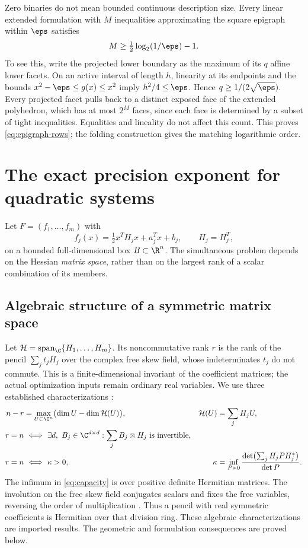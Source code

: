 Zero binaries do not mean bounded continuous description size. Every
linear extended formulation with $M$ inequalities approximating the
square epigraph within $\eps$ satisfies
\begin{equation}\label{eq:epigraph-rows}
 M\ge\tfrac12\log_2(1/\eps)-1.
\end{equation}
To see this, write the projected lower boundary as the maximum of its
$q$ affine lower facets. On an active interval of length $h$, linearity
at its endpoints and the bounds $x^2-\eps\le g(x)\le x^2$ imply
$h^2/4\le\eps$. Hence $q\ge1/(2\sqrt\eps)$. Every projected facet
pulls back to a distinct exposed face of the extended polyhedron, which
has at most $2^M$ faces, since each face is determined by a subset of
tight inequalities. Equalities and lineality do not affect this count.
This proves \eqref{eq:epigraph-rows}; the folding construction gives
the matching logarithmic order.

\section{The exact precision exponent for quadratic systems}\label{sec:ncrank}

Let $F=(f_1,\ldots,f_m)$ with
\[
 f_j(x)=\tfrac12x^TH_jx+a_j^Tx+b_j,\qquad H_j=H_j^T,
\]
on a bounded full-dimensional box $B\subset\R^n$. The simultaneous
problem depends on the Hessian \emph{matrix space}, rather than on the
largest rank of a scalar combination of its members.

\subsection{Algebraic structure of a symmetric matrix space}

Let $\mathcal H=\operatorname{span}_{\C}\{H_1,\ldots,H_m\}$.
Its noncommutative rank $r$ is the rank of the pencil
$\sum_jt_jH_j$ over the complex free skew field, whose indeterminates
$t_j$ do not commute. This is a finite-dimensional invariant of the
coefficient matrices; the actual optimization inputs remain ordinary
real variables. We use three established characterizations
\citep[Theorems 1.4 and 1.17]{ggow2020}:
\begin{align}
 n-r&=\max_{U\subset\C^n}
       \bigl(\dim U-\dim\mathcal H(U)\bigr),
 &\mathcal H(U)&=\sum_jH_jU,\label{eq:shrunk}\\
 r=n&\ \Longleftrightarrow\ 
 \exists d,\ B_j\in\C^{d\times d}:
       \sum_j B_j\otimes H_j\text{ is invertible},\label{eq:evaluation}\\
 r=n&\ \Longleftrightarrow\ \kappa>0,
 &\kappa&=\inf_{P\succ0}
 \frac{\det\bigl(\sum_jH_jPH_j^*\bigr)}{\det P}.
 \label{eq:capacity}
\end{align}
The infimum in \eqref{eq:capacity} is over positive definite Hermitian
matrices. The involution on the free skew field conjugates scalars and
fixes the free variables, reversing the order of multiplication
\citep[Section 2.1]{volcic2021}. Thus a pencil with real symmetric
coefficients is Hermitian over that division ring. These algebraic
characterizations are imported results. The geometric and formulation
consequences are proved below.

